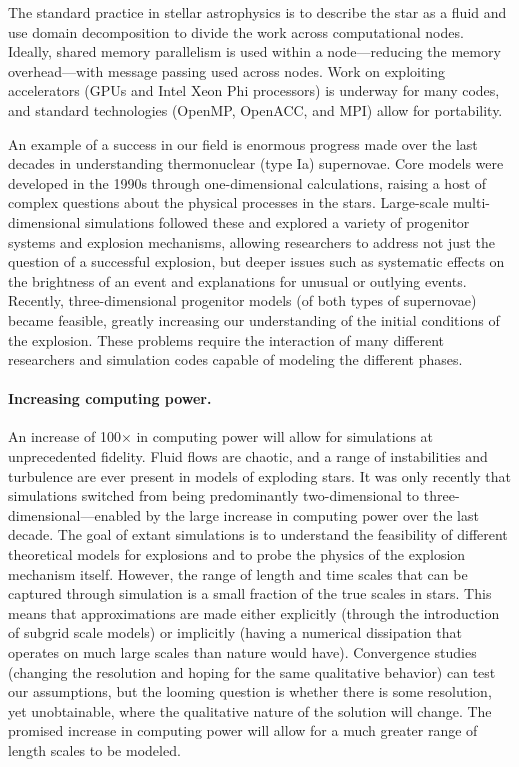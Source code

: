 \documentclass[11pt,twocolumn]{article}
\begin{document}
The standard practice in stellar astrophysics is to describe the star
as a fluid and use domain decomposition to divide the work across
computational nodes.  Ideally, shared memory parallelism is used
within a node---reducing the memory overhead---with message
passing used across nodes.  Work on exploiting accelerators (GPUs and
Intel Xeon Phi processors) is underway for many codes, and standard
technologies (OpenMP, OpenACC, and MPI) allow for portability.

An example of a success in our field is enormous progress made over
the last decades in understanding thermonuclear (type Ia) supernovae.
Core models were developed in the 1990s through one-dimensional
calculations, raising a host of complex questions about the physical
processes in the stars.  Large-scale multi-dimensional simulations
followed these and explored a variety of progenitor systems and explosion
mechanisms, allowing researchers to address not just the question of a
successful explosion, but deeper issues such as systematic effects on
the brightness of an event and explanations for unusual or outlying
events.  Recently, three-dimensional progenitor models (of both types
of supernovae) became feasible, greatly increasing our understanding
of the initial conditions of the explosion.  These problems require
the interaction of many different researchers and simulation codes
capable of modeling the different phases.

\paragraph*{Increasing computing power.}

An increase of 100$\times$ in computing power will allow for
simulations at unprecedented fidelity. Fluid flows are chaotic, and a
range of instabilities and turbulence are ever present in models of
exploding stars. It was only recently that simulations switched from
being predominantly two-dimensional to three-dimensional---enabled by
the large increase in computing power over the last decade.  The goal
of extant simulations is to understand the feasibility of different
theoretical models for explosions and to probe the physics of the
explosion mechanism itself.  However, the range of length and time
scales that can be captured through simulation is a small fraction of
the true scales in stars.  This means that approximations are made
either explicitly (through the introduction of subgrid scale models)
or implicitly (having a numerical dissipation that operates on much
large scales than nature would have).  Convergence studies (changing
the resolution and hoping for the same qualitative behavior) can test
our assumptions, but the looming question is whether there is some
resolution, yet unobtainable, where the qualitative nature of the
solution will change.  The promised increase in computing power will
allow for a much greater range of length scales to be modeled.
\end{document}
